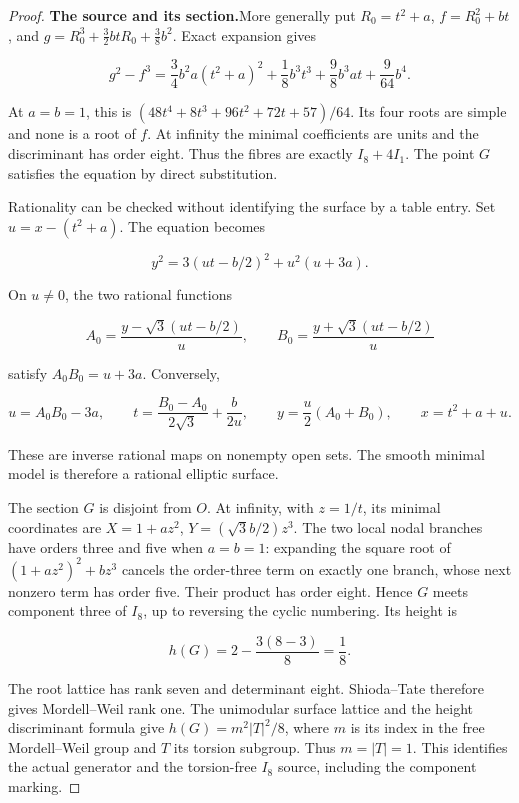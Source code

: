 \begin{proof}
\par\medskip\noindent\textbf{The source and its section.}\enspace More generally put
\(R_0=t^2+a\),
\(f=R_0^2+bt\), and
\(g=R_0^3+\frac32btR_0+\frac38b^2\).  Exact expansion gives

\[
 g^2-f^3=
 \frac34b^2a(t^2+a)^2+
 \frac18b^3t^3+\frac98b^3at+\frac9{64}b^4.
\]

At \(a=b=1\), this is
\((48t^4+8t^3+96t^2+72t+57)/64\).  Its four roots are simple
and none is a root of \(f\).  At infinity the minimal coefficients
are units and the discriminant has order eight.  Thus the fibres
are exactly \(I_8+4I_1\).  The point \(G\) satisfies the equation
by direct substitution.

Rationality can be checked without identifying the surface by a
table entry.  Set \(u=x-(t^2+a)\).  The equation becomes

\[
 y^2=3(ut-b/2)^2+u^2(u+3a).
\]

On \(u\ne0\), the two rational functions

\[
 A_0=\frac{y-\sqrt3(ut-b/2)}u,
 \qquad B_0=\frac{y+\sqrt3(ut-b/2)}u
\]

satisfy \(A_0B_0=u+3a\).  Conversely,

\[
 u=A_0B_0-3a,\qquad
 t=\frac{B_0-A_0}{2\sqrt3}+\frac b{2u},\qquad
 y=\frac u2(A_0+B_0),\qquad x=t^2+a+u.
\]

These are inverse rational maps on nonempty open sets.  The smooth
minimal model is therefore a rational elliptic surface.

The section \(G\) is disjoint from \(O\).  At infinity, with
\(z=1/t\), its minimal coordinates are
\(X=1+az^2\), \(Y=(\sqrt3b/2)z^3\).
The two local nodal branches have orders three and five when
\(a=b=1\): expanding the square root of
\((1+az^2)^2+bz^3\) cancels the order-three term on exactly
one branch, whose next nonzero term has order five.  Their product
has order eight.  Hence \(G\) meets component three of \(I_8\),
up to reversing the cyclic numbering.  Its height is

\[
 h(G)=2-\frac{3(8-3)}8=\frac18.
\]

The root lattice has rank seven and determinant eight.  Shioda--Tate
therefore gives Mordell--Weil rank one.  The unimodular surface
lattice and the height discriminant formula give
\(h(G)=m^2|T|^2/8\), where \(m\) is its index in the free
Mordell--Weil group and \(T\) its torsion subgroup.  Thus
\(m=|T|=1\).  This identifies the actual generator and the
torsion-free \(I_8\) source, including the component marking.


\end{proof}
